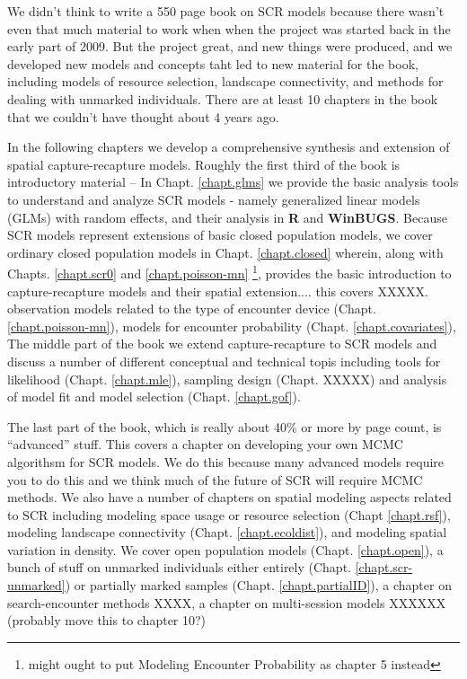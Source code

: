 We didn't
think to write a 550 page book on SCR models because there wasn't even
that much material to work when when the project was started back in
the early part of 2009. But the project great, and new things were
produced, and we developed new models and concepts taht led to new
material for the book, including models of resource selection,
landscape connectivity, and methods for dealing with unmarked
individuals. There are at least 10 chapters in the book that we
couldn't have thought about 4 years ago. 

In the following chapters we develop a comprehensive synthesis and extension of
spatial capture-recapture models.
Roughly the first third of the book is introductory material --
In Chapt. \ref{chapt.glms} we provide the basic analysis tools to understand and
analyze SCR models - namely generalized linear models (GLMs) with random effects, and their
analysis in {\bf R} and {\bf WinBUGS}.  Because SCR models represent extensions of
basic closed population models, we cover ordinary closed population
models in Chapt. \ref{chapt.closed} wherein, along with Chapts. \ref{chapt.scr0} and \ref{chapt.poisson-mn}
\footnote{might ought to put Modeling Encounter Probability
  as chapter 5 instead}, provides the basic introduction
to capture-recapture models and their spatial extension.... this
covers XXXXX.
observation models related to the type of encounter device (Chapt. \ref{chapt.poisson-mn}), models for encounter probability
(Chapt. \ref{chapt.covariates}),
The middle part of the book we extend capture-recapture to SCR models
and discuss a number of different conceptual and technical topis
including 
tools for likelihood (Chapt. \ref{chapt.mle}), sampling design
(Chapt. XXXXX) and analysis of model fit and model selection
(Chapt. \ref{chapt.gof}). 

The last part of the book, which is really about 40\% or more by page
count, is ``advanced'' stuff. This covers a chapter on developing your
own MCMC algorithsm for SCR models. We do this because many advanced
models require you to do this and we think much of the future of SCR
will require MCMC methods. 
We also have a number of chapters on spatial modeling aspects related
to SCR including modeling 
space usage or resource selection (Chapt \ref{chapt.rsf}), modeling
landscape connectivity (Chapt. \ref{chapt.ecoldist}), and modeling
spatial variation in density. 
We cover open population models (Chapt. \ref{chapt.open}),
a bunch of stuff on unmarked individuals either entirely (Chapt. \ref{chapt.scr-unmarked})
or partially marked samples (Chapt. \ref{chapt.partialID}), 
a chapter on search-encounter methods XXXX, a chapter on multi-session
models XXXXXX (probably move this to chapter 10?)


